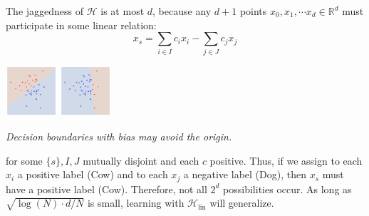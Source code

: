 \documentclass[openany, notitlepage, justified]{tufte-book}
\newcommand{\RR}{\mathbb{R}}
\newcommand{\Hh}{\mathcal{H}}
\begin{document}
            The jaggedness of $\Hh$ is at most $d$, because any $d+1$ points
            $x_0, x_1,\cdots x_d \in \RR^d$ must participate in some linear
            relation:
            $$
                x_s = 
                \sum_{i\in I} c_i x_i
                -
                \sum_{j\in J} c_j x_j
            $$
            {\def\par{\let\par\endgraf}\begin{marginfigure}
                \centering
                \includegraphics[height=1.9cm]{db-bias-a}
                \includegraphics[height=1.9cm]{db-bias-b}
                \caption{\emph{
                    Decision boundaries with bias may avoid the origin.
                }}
                \label{fig:bias}
            \end{marginfigure}}
            for some $\{s\},I,J$ mutually disjoint and each $c$ positive.
            Thus, if we assign to each $x_i$ a positive label (Cow) and to each
            $x_j$ a negative label (Dog), then $x_s$ must have a positive label
            (Cow).  Therefore, not all $2^d$ possibilities occur.  As long
            as $\sqrt{\log(N)\cdot d/N}$ is small, learning with
            $\Hh_{\text{lin}}$ will generalize.
\end{document}
